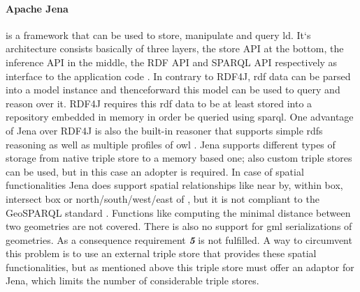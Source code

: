 \documentclass[draft,final]{vutinfth} %
\begin{document}
\paragraph{Apache Jena} is a framework that can be used to store, manipulate and query \gls{ld}. It`s architecture consists basically of three layers, the store API at the bottom, the inference API in the middle, the RDF API and  SPARQL API respectively as interface to the application code \cite{the_apache_software_foundation_jena_????}. In contrary to RDF4J, \gls{rdf} data can be parsed into a model instance and thenceforward this model can be used to query and reason over it. RDF4J requires this \gls{rdf} data to be at least stored into a repository embedded in memory in order be queried using \gls{sparql}. One advantage of Jena over RDF4J is also the built-in reasoner that supports simple \gls{rdfs} reasoning as well as multiple profiles of \gls{owl} \cite{the_apache_software_foundation_jena_????-1}. Jena supports different types of storage from native triple store to a memory based one; also custom triple stores can be used, but in this case an adopter is required. In case of spatial functionalities Jena does support spatial relationships like near by, within box, intersect box or north/south/west/east of \cite{the_apache_software_foundation_spatial_????}, but it is not compliant to the GeoSPARQL standard . Functions like computing the minimal distance between two geometries are not covered. There is also no support for \gls{gml} serializations of geometries. As a consequence requirement \textbf{\textit{5}} is not fulfilled. A way to circumvent this problem is to use an external triple store that provides these spatial functionalities, but as mentioned above this triple store must offer an adaptor for Jena, which limits the number of considerable triple stores.
 
\end{document}
